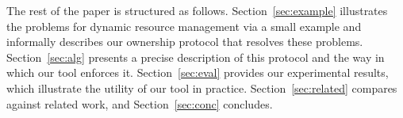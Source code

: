 The rest of the paper is structured as follows.
Section~\ref{sec:example} illustrates the problems for dynamic
resource management via a small example and informally describes our ownership
protocol that resolves these problems.  Section~\ref{sec:alg} presents
a precise description of this protocol and the way in which our tool
enforces it.  Section~\ref{sec:eval} provides our experimental
results, which illustrate the utility of our tool in practice.
Section~\ref{sec:related} compares against related work, and
Section~\ref{sec:conc} concludes.



